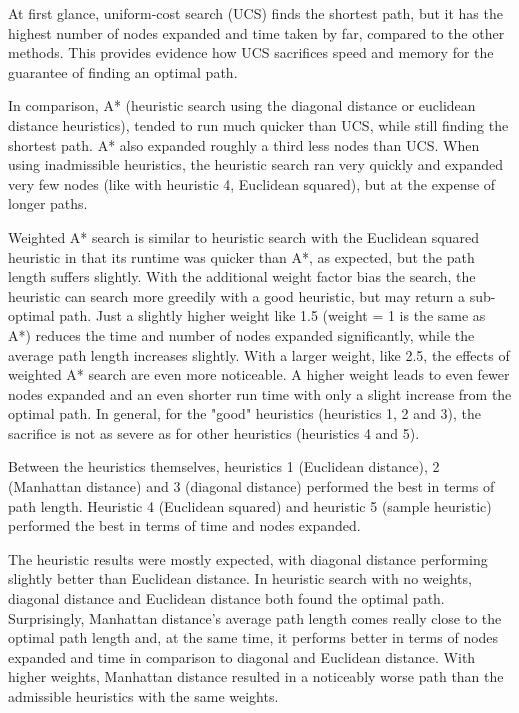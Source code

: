 \documentclass[12pt, letterpaper]{article}
\begin{document}
At first glance, uniform-cost search (UCS) finds the shortest path, but it has the highest number of nodes expanded and time taken by far, compared to the other methods. This provides evidence how UCS sacrifices speed and memory for the guarantee of finding an optimal path.

In comparison, A* (heuristic search using the diagonal distance or euclidean distance heuristics),  tended to run much quicker than UCS, while still finding the shortest path. A* also expanded roughly a third less nodes than UCS. When using inadmissible heuristics, the heuristic search ran very quickly and expanded very few nodes (like with heuristic 4, Euclidean squared), but at the expense of longer paths.

Weighted A* search is similar to heuristic search with the Euclidean squared heuristic in that its runtime was quicker than A*, as expected, but the path length suffers slightly. With the additional weight factor bias the search, the heuristic can search more greedily with a good heuristic, but may return a sub-optimal path. Just a slightly higher weight like 1.5 (weight = 1 is the same as A*) reduces the time and number of nodes expanded significantly, while the average path length increases slightly. With a larger weight, like 2.5, the effects of weighted A* search are even more noticeable. A higher weight leads to even fewer nodes expanded and an even shorter run time with only a slight increase from the optimal path. In general, for the "good" heuristics (heuristics 1, 2 and 3), the sacrifice is not as severe as for other heuristics (heuristics 4 and 5). \newline

Between the heuristics themselves, heuristics 1 (Euclidean distance), 2 (Manhattan distance) and 3 (diagonal distance) performed the best in terms of path length. Heuristic 4 (Euclidean squared) and heuristic 5 (sample heuristic) performed the best in terms of time and nodes expanded.

The heuristic results were mostly expected, with diagonal distance performing slightly better than Euclidean distance. In heuristic search with no weights, diagonal distance and Euclidean distance both found the optimal path. Surprisingly, Manhattan distance's average path length comes really close to the optimal path length and, at the same time, it performs better in terms of nodes expanded and time in comparison to diagonal and Euclidean distance. With higher weights, Manhattan distance resulted in a noticeably worse path than the admissible heuristics with the same weights. 
\end{document}
